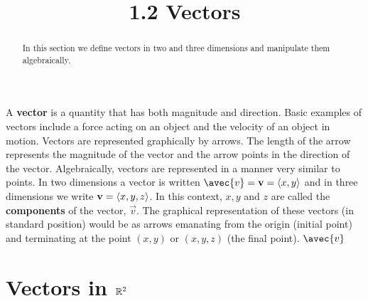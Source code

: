 \documentclass[handout]{ximera}
\title{1.2 Vectors}
\begin{document}
\begin{abstract}
In this section we define vectors in two and three dimensions and manipulate them algebraically.
\end{abstract}
 
\maketitle

A {\bf vector} is a quantity that has both magnitude and direction. Basic examples of vectors include a force acting on an object and the velocity of an object in motion.
Vectors are represented graphically by arrows.  The length of the arrow represents the magnitude of the vector and the arrow points in the direction of the vector.
Algebraically, vectors are represented in a manner very similar to points.  In two dimensions a vector is written $\avec{v} = \vec{v} = \vector{x,y}$ and in three dimensions we write 
$\mathbf{v} = \left\langle x,y, z\right\rangle$.  In this context, $x, y$ and $z$ are called the {\bf components} of the vector, $\vec{v}$. 
The graphical representation of these vectors (in standard position)
would be as arrows emanating from the origin (initial point) and terminating at the point $(x,y)$ or $(x,y,z)$ (the final point).
$\avec{v}$
\section{Vectors in $\mathbb R^2$}
\end{document}
